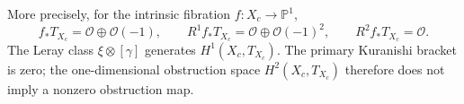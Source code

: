 \label{ari:C.8.5}
\label{inv:D1.3}\label{inv:D2.1}\label{inv:D3.1}
More precisely, for the intrinsic fibration $f:X_c\to\mathbb P^1$,
\[
 f_*T_{X_c}=\mathcal O\oplus\mathcal O(-1),\qquad
 R^1f_*T_{X_c}=\mathcal O\oplus\mathcal O(-1)^2,\qquad
 R^2f_*T_{X_c}=\mathcal O.\tag{D.4}
\]
The Leray class $\xi\otimes[\gamma]$ generates $H^1(X_c,T_{X_c})$.
The primary Kuranishi bracket is zero; the one-dimensional obstruction
space $H^2(X_c,T_{X_c})$ therefore does not imply a nonzero obstruction
map.
